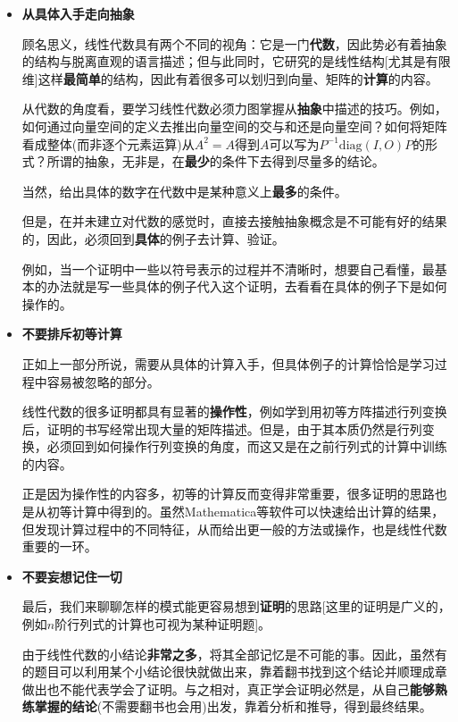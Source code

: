 \documentclass[a4paper,UTF8,fontset=windows]{ctexart}
\newcommand*{\note}{\noindent *}
\begin{document}
\begin{itemize}
    \item \textbf{从具体入手走向抽象}
    
    顾名思义，线性代数具有两个不同的视角：它是一门\textbf{代数}，因此势必有着抽象的结构与脱离直观的语言描述；但与此同时，它研究的是线性结构[尤其是有限维]这样\textbf{最简单}的结构，因此有着很多可以划归到向量、矩阵的\textbf{计算}的内容。

    从代数的角度看，要学习线性代数必须力图掌握从\textbf{抽象}中描述的技巧。例如，如何通过向量空间的定义去推出向量空间的交与和还是向量空间？如何将矩阵看成整体(而非逐个元素运算)从$A^2=A$得到$A$可以写为$P^{-1}\mathrm{diag}(I,O)P$的形式？所谓的抽象，无非是，在\textbf{最少}的条件下去得到尽量多的结论。

    \note 当然，给出具体的数字在代数中是某种意义上\textbf{最多}的条件。

    但是，在并未建立对代数的感觉时，直接去接触抽象概念是不可能有好的结果的，因此，必须回到\textbf{具体}的例子去计算、验证。

    例如，当一个证明中一些以符号表示的过程并不清晰时，想要自己看懂，最基本的办法就是写一些具体的例子代入这个证明，去看看在具体的例子下是如何操作的。

    \item \textbf{不要排斥初等计算}
    
    正如上一部分所说，需要从具体的计算入手，但具体例子的计算恰恰是学习过程中容易被忽略的部分。

    线性代数的很多证明都具有显著的\textbf{操作性}，例如学到用初等方阵描述行列变换后，证明的书写经常出现大量的矩阵描述。但是，由于其本质仍然是行列变换，必须回到如何操作行列变换的角度，而这又是在之前行列式的计算中训练的内容。

    正是因为操作性的内容多，初等的计算反而变得非常重要，很多证明的思路也是从初等计算中得到的。虽然Mathematica等软件可以快速给出计算的结果，但发现计算过程中的不同特征，从而给出更一般的方法或操作，也是线性代数重要的一环。

    \item \textbf{不要妄想记住一切}
    
    最后，我们来聊聊怎样的模式能更容易想到\textbf{证明}的思路[这里的证明是广义的，例如$n$阶行列式的计算也可视为某种证明题]。

    由于线性代数的小结论\textbf{非常之多}，将其全部记忆是不可能的事。因此，虽然有的题目可以利用某个小结论很快就做出来，靠着翻书找到这个结论并顺理成章做出也不能代表学会了证明。与之相对，真正学会证明必然是，从自己\textbf{能够熟练掌握的结论}(不需要翻书也会用)出发，靠着分析和推导，得到最终结果。


\end{itemize}
\end{document}
